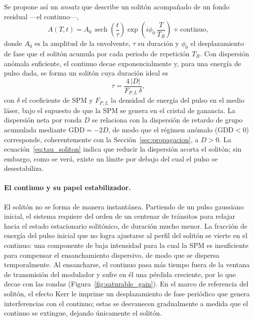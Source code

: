 Se propone así un \emph{ansatz} que describe un solitón acompañado de un fondo
residual —el continuo—,
%
\begin{equation}
    A(T,t) = A_0\,\operatorname{sech}\!\left(\frac{t}{\tau}\right)
    \exp\!\left(i\phi_0\,\frac{T}{T_R}\right) + \text{continuo},
    \label{eq:ansatz_soliton}
\end{equation}
%
donde $A_0$ es la amplitud de la envolvente, $\tau$ su duración y $\phi_0$ el
desplazamiento de fase que el solitón acumula por cada periodo de repetición
$T_R$. Con dispersión anómala suficiente, el continuo decae exponencialmente y,
para una energía de pulso dada, se forma un solitón cuya duración ideal es
%
\begin{equation}
    \tau = \frac{4\,|D|}{F_{P,L}\,\delta},
    \label{eq:tau_soliton}
\end{equation}
%
con $\delta$ el coeficiente de SPM y $F_{P,L}$ la densidad de energía del pulso en
el medio láser, bajo el supuesto de que la SPM se genera en el cristal de
ganancia. La dispersión neta por ronda $D$ se relaciona con la dispersión de
retardo de grupo acumulada mediante $\mathrm{GDD}=-2D$, de modo que el régimen
anómalo ($\mathrm{GDD}<0$) corresponde, coherentemente con la
Sección~\ref{sec:propagacion}, a $D>0$. La ecuación~\eqref{eq:tau_soliton} indica
que reducir la dispersión acorta el solitón; sin embargo, como se verá, existe un
límite por debajo del cual el pulso se desestabiliza.

\paragraph{El continuo y su papel estabilizador.}
El solitón no se forma de manera instantánea. Partiendo de un pulso gaussiano
inicial, el sistema requiere del orden de un centenar de tránsitos para relajar
hacia el estado estacionario solitónico, de duración mucho menor. La fracción de
energía del pulso inicial que no logra ajustarse al perfil del solitón se vierte
en el continuo: una componente de baja intensidad para la cual la SPM es
insuficiente para compensar el ensanchamiento dispersivo, de modo que se dispersa
temporalmente. Al ensancharse, el continuo pasa más tiempo fuera de la ventana de
transmisión del modulador y sufre en él una pérdida creciente, por lo que decae
con las rondas (Figura~\ref{fig:saturable_gain}). En el marco de referencia del
solitón, el efecto Kerr le imprime un desplazamiento de fase periódico que genera
interferencias con el continuo; estas se desvanecen gradualmente a medida que el
continuo se extingue, dejando únicamente el solitón.

